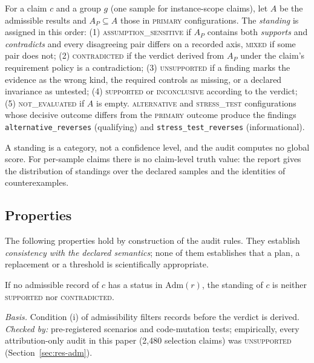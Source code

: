 \begin{definition}[Standing]
For a claim $c$ and a group $g$ (one sample for instance-scope claims), let $A$ be the admissible results and $A_P\subseteq A$ those in \textsc{primary} configurations. The \emph{standing} is assigned in this order:
(1) \textsc{assumption\_sensitive} if $A_P$ contains both \emph{supports} and \emph{contradicts} and every disagreeing pair differs on a recorded axis, \textsc{mixed} if some pair does not;
(2) \textsc{contradicted} if the verdict derived from $A_P$ under the claim's requirement policy is a contradiction;
(3) \textsc{unsupported} if a finding marks the evidence as the wrong kind, the required controls as missing, or a declared invariance as untested;
(4) \textsc{supported} or \textsc{inconclusive} according to the verdict;
(5) \textsc{not\_evaluated} if $A$ is empty.
\textsc{alternative} and \textsc{stress\_test} configurations whose decisive outcome differs from the \textsc{primary} outcome produce the findings \texttt{alternative\_reverses} (qualifying) and \texttt{stress\_test\_reverses} (informational).
\end{definition}

A standing is a category, not a confidence level, and the audit computes no global score. For per-sample claims there is no claim-level truth value: the report gives the distribution of standings over the declared samples and the identities of counterexamples.

\subsection{Properties}
\label{sec:properties}

The following properties hold by construction of the audit rules. They establish \emph{consistency with the declared semantics}; none of them establishes that a plan, a replacement or a threshold is scientifically appropriate.

\begin{proposition}[Admissibility]
\label{prop:adm}
If no admissible record of $c$ has a status in $\mathrm{Adm}(r)$, the standing of $c$ is neither \textsc{supported} nor \textsc{contradicted}.
\end{proposition}
\emph{Basis.} Condition (i) of admissibility filters records before the verdict is derived. \emph{Checked by:} pre-registered scenarios and code-mutation tests; empirically, every attribution-only audit in this paper (2,480 selection claims) was \textsc{unsupported} (Section~\ref{sec:res-adm}).

